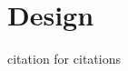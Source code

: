 \documentclass[a4paper]{report}
\begin{document}
\chapter{Design}


% 
%
% 
%
% 
%
% 
%


\newpage
citation for citations\cite{Bengtsson1995}




\newpage



\appendix

\end{document}
